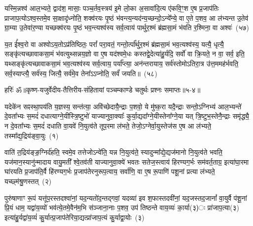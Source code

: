 यस्मि॒न्नश्व॑ आल॒भ्यते॒ द्वाद॑श॒ मासाः॒ पञ्च॒र्तव॒स्त्रय॑ इ॒मे लो॒का अ॒सावा॑दि॒त्य ए॑कवि॒ꣳ॒श ए॒ष प्र॒जा\-प॑तिः प्राजाप॒त्यो\-ऽश्व॒स्तमे॒व सा॒क्षादृ॑ध्नोति॒ शक्व॑रयः पृ॒ष्ठं भ॑वन्त्य॒न्यद॑न्य॒च्छन्दो॒\-ऽन्ये᳚न्ये॒ वा ए॒ते प॒शव॒ आ ल॑भ्यन्त उ॒तेव॑ ग्रा॒म्या उ॒तेवा॑र॒ण्या यच्छक्व॑रयः पृ॒ष्ठं भव॒न्त्यश्व॑स्य सर्व॒त्वाय॑ पार्थुर॒श्मं ब्र॑ह्मसा॒मं भ॑वति र॒श्मिना॒ वा अश्वः॑~(५७)

य॒त ई᳚श्व॒रो वा अश्वो\-ऽय॒तो\-ऽप्र॑तिष्ठितः॒ परां᳚ परा॒वतं॒ गन्तो॒र्त्पा᳚र्थुर॒श्मं ब्र॑ह्मसा॒मं भव॒त्यश्व॑स्य॒ यत्यै॒ धृत्यै॒ सङ्कृ॑त्यच्छावाकसा॒मं भ॑वत्युथ्सन्नय॒ज्ञो वा ए॒ष यद॑श्वमे॒धः कस्तद्वे॒देत्या॑हु॒र्यदि॒ सर्वो॑ वा क्रि॒यते॒ न वा॒ सर्व॒ इति॒ यथ्सङ्कृ॑त्यच्छावाकसा॒मं भव॒त्यश्व॑स्य सर्व॒त्वाय॒ पर्या᳚प्त्या॒ अन॑न्तरायाय॒ सर्व॑स्तोमो\-ऽतिरा॒त्र उ॑त्त॒ममह॑र्भवति॒ सर्व॒स्याप्त्यै॒ सर्व॑स्य॒ जित्यै॒ सर्व॑मे॒व तेना᳚\-ऽऽ\-प्नोति॒ सर्वं॑ जयति॥~(५८)

{}%

{हरिः॑ ॐ}{॥कृष्ण-यजुर्वेदीय-तैत्तिरीय-संहितायां पञ्चम्काण्डे चतुर्थः प्रश्नः समाप्तः॥५-४॥}

\setcounter{anuvakam}{0}
यदेके॑न सꣴस्था॒पय॑ति य॒ज्ञस्य॒ सन्त॑त्या॒ अवि॑च्छेदायै॒न्द्राः प॒शवो॒ ये मु॑ष्क॒रा यदै॒न्द्राः सन्तो॒\-ऽग्निभ्य॑ आल॒भ्यन्ते॑ दे॒वता᳚भ्यः स॒मदं॑ दधात्याग्ने॒यीस्त्रि॒ष्टुभो॑ याज्यानुवा॒क्याः᳚ कुर्या॒द्यदा᳚ग्ने॒यीस्तेना᳚ग्ने॒या यत् त्रि॒ष्टुभ॒स्तेनै॒न्द्राः समृ॑द्ध्यै॒ न दे॒वता᳚भ्यः स॒मदं॑ दधाति वा॒यवे॑ नि॒युत्व॑ते तूप॒रमा ल॑भते॒ तेजो॒\-ऽग्नेर्वा॒युस्तेज॑स ए॒ष आ ल॑भ्यते॒ तस्मा᳚द्य॒द्रिय॑ङ्वा॒युः~(१)

वाति॑ त॒द्रिय॑ङ्ङ॒ग्निर्द॑हति॒ स्वमे॒व तत्तेजो\-ऽन्वे॑ति॒ यन्न नि॒युत्व॑ते॒ स्यादुन्मा᳚द्ये॒द्यज॑मानो नि॒युत्व॑ते भवति॒ यज॑मान॒स्यानु॑न्मादाय वायु॒मती᳚ श्वे॒तव॑ती याज्यानुवा॒क्ये॑ भवतः सतेज॒स्त्वाय॑ हिरण्यग॒र्भः सम॑वर्त॒ताग्र॒ इत्या॑घा॒रमा घा॑रयति प्र॒जा\-प॑ति॒र्वै हि॑रण्यग॒र्भः प्र॒जा\-प॑तेरनुरूप॒त्वाय॒ सर्वा॑णि॒ वा ए॒ष रू॒पाणि॑ पशू॒नां प्रत्या ल॑भ्यते॒ यच्छ्म॑श्रु॒णस्तत्~(२)

पुरु॑षाणाꣳ रू॒पं यत्तू॑प॒रस्तदश्वा॑नां॒ यद॒न्यतो॑द॒न्तद्गवां॒ यदव्या॑ इव श॒फास्तदवी॑नां॒ यद॒जस्तद॒जानां᳚ वा॒युर्वै प॑शू॒नां प्रि॒यं धाम॒ यद्वा॑य॒व्यो॑ भव॑त्ये॒तमे॒वैन॑म॒भि स॑ञ्जाना॒नाः प॒शव॒ उप॑ तिष्ठन्ते वाय॒व्यः॑ का॒र्या(३)ः प्रा॑जाप॒त्या(३) इत्या॑हु॒र्यद्वा॑य॒व्यं॑ कु॒र्यात्प्र॒जा\-प॑तेरिया॒द्यत्प्रा॑जाप॒त्यं कु॒र्याद्वा॒योः~(३)

